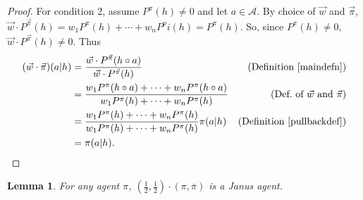 \documentclass[twoside]{article}
\newtheorem{lemma}[theorem]{Lemma}
\begin{document}
\begin{proof}
        For condition 2,
        assume $P^\pi(h)\not=0$ and let $a\in\mathcal A$.
        By choice of $\vec w$ and $\vec\pi$,
        $\vec w\cdot{P^{\vec\pi}}(h)=w_1P^\pi(h)+\cdots+w_nP^pi(h)=P^\pi(h)$.
        So, since $P^\pi(h)\not=0$, $\vec w\cdot{P^{\vec\pi}}(h)\not=0$.
        Thus
        \begin{align*}
            (\vec w\cdot\vec\pi)(a|h)
                &= \frac{\vec w\cdot {P^{\vec\pi}}(h\circ a)}{\vec w\cdot{P^{\vec\pi}}(h)}
                    &\mbox{(Definition \ref{maindefn})}\\
                &= \frac{w_1P^\pi(h\circ a)+\cdots+w_nP^\pi(h\circ a)}
                    {w_1P^\pi(h)+\cdots+w_nP^\pi(h)}
                    &\mbox{(Def.\ of $\vec w$ and $\vec\pi$)}\\
                &= \frac{w_1P^\pi(h)+\cdots+w_nP^\pi(h)}{w_1P^\pi(h)+\cdots+w_nP^\pi(h)}
                    \pi(a|h)
                    &\mbox{(Definition \ref{pullbackdef})}\\
                &= \pi(a|h).
        \end{align*}
\end{proof}

\begin{lemma}
\label{reflectionmakesjanuslemma}
    For any agent $\pi$,
    $(\frac12,\frac12)\cdot(\pi,\overline\pi)$ is a Janus agent.
\end{lemma}
\end{document}
